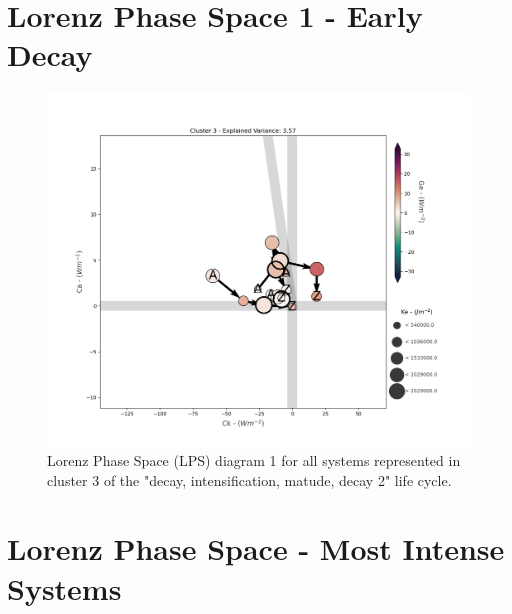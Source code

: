 \chapter{Lorenz Phase Space 1 - Early Decay}\label{ap:07}

\begin{figure}[!htbp]
\centering
\includegraphics[width=\textwidth]{figs_appendix/lps_mixed_cluster_3_all_systems.png}
\caption[LPS 1 - Cluster 3 - DItMD]{Lorenz Phase Space (LPS) diagram 1 for all systems represented in cluster 3 of the "decay, intensification, matude, decay 2" life cycle.}
\label{fig:lps_mixed_cluster_3_all_systems}
\end{figure}

\chapter{Lorenz Phase Space - Most Intense Systems}\label{ap:08}

